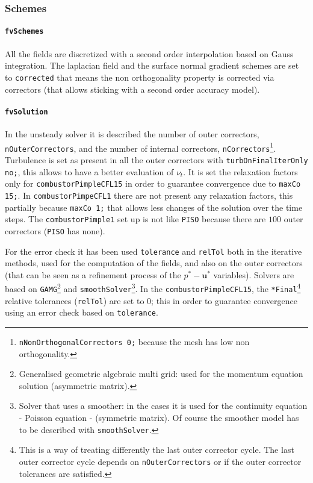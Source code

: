 \subsubsection{Schemes}
\cprotect\paragraph{\verb|fvSchemes|} All the fields are discretized with a second order interpolation based on Gauss integration. The laplacian field and the surface normal gradient schemes are set to \verb|corrected| that means the non orthogonality property is corrected via correctors (that allows sticking with a second order accuracy model).  

\cprotect\paragraph{\verb|fvSolution|}
In the unsteady solver it is described the number of outer correctors, \verb|nOuterCorrectors|, and the number of internal correctors, \verb|nCorrectors|\cprotect\footnote{\verb|nNonOrthogonalCorrectors 0;| because the mesh has low non orthogonality.}. Turbulence is set as present in all the outer correctors with \verb|turbOnFinalIterOnly no;|, this allows to have a better evaluation of $\nu_t$. It is set the relaxation factors only for \verb|combustorPimpleCFL15| in order to guarantee convergence due to \verb|maxCo 15;|. In \verb|combustorPimpeCFL1| there are not present any relaxation factors, this partially because \verb|maxCo 1;| that allows less changes of the solution over the time steps. The \verb|combustorPimple1| set up is not like \verb|PISO| because there are $100$ outer correctors (\verb|PISO| has none). 

For the error check it has been used \verb|tolerance| and \verb|relTol| both in the iterative methods, used for the computation of the fields, and also on the outer correctors (that can be seen as a refinement process of the $p^* - \boldsymbol{u}^*$ variables). Solvers are based on \verb|GAMG|\footnote{Generalised geometric algebraic multi grid: used for the momentum equation solution (asymmetric matrix).} and \verb|smoothSolver|\cprotect\footnote{Solver that uses a smoother: in the cases it is used for the continuity equation - Poisson equation - (symmetric matrix). Of course the smoother model has to be described with \verb|smoothSolver|.}. In the \verb|combustorPimpleCFL15|, the \verb|*Final|\cprotect\footnote{This is a way of treating differently the last outer corrector cycle. The last outer corrector cycle depends on \verb|nOuterCorrectors| or if the outer corrector tolerances are satisfied.} relative tolerances (\verb|relTol|) are set to $0$; this in order to guarantee convergence using an error check based on \verb|tolerance|. 

